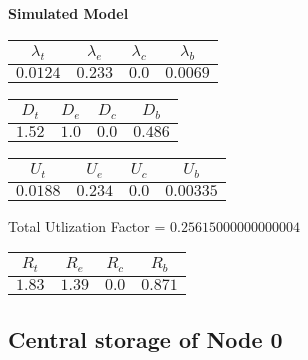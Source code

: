 \documentclass{article}
\begin{document}
\begin{minipage}{0.5\textwidth}
\centering	\textbf{Simulated Model}
\begin{table}[H]
\centering
\begin{tabular}{@{}cccc@{}}
\toprule
$\lambda_t$ & $\lambda_e$ & $\lambda_c$ & $\lambda_b$\\
\midrule
$0.0124$ & $0.233$ & $0.0$ & $0.0069$\\
\bottomrule
\end{tabular}
\end{table}
\begin{table}[H]
\centering
\begin{tabular}{@{}cccc@{}}
\toprule
$D_t$ & $D_e$ & $D_c$ & $D_b$\\
\midrule
$1.52$ & $1.0$ & $0.0$ & $0.486$\\
\bottomrule
\end{tabular}
\end{table}\begin{table}[H]
\centering
\begin{tabular}{@{}cccc@{}}
\toprule
$U_t$ & $U_e$ & $U_c$ & $U_b$\\
\midrule
$0.0188$ & $0.234$ & $0.0$ & $0.00335$\\
\bottomrule
\end{tabular}
\end{table}
\centering Total Utlization Factor = $0.25615000000000004$
\begin{table}[H]
\centering
\begin{tabular}{@{}cccc@{}}
\toprule
$R_t$ & $R_e$ & $R_c$ & $R_b$\\
\midrule
$1.83$ & $1.39$ & $0.0$ & $0.871$\\
\bottomrule
\end{tabular}
\end{table}
\end{minipage}\subsection{Central storage of Node 0}
\end{document}
